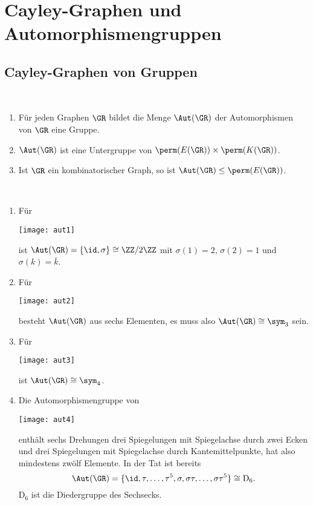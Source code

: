 \chapter{Cayley-Graphen und Automorphismengruppen}

\section{Cayley-Graphen von Gruppen}\label{sec_cayley}

\BEM\
\begin{enumerate}
\item Für jeden Graphen $\GR$ bildet die Menge $\Aut(\GR)$ der
Automorphismen von $\GR$ eine Gruppe.\index{$\Aut(\GR)$}
\item $\Aut(\GR)$ ist eine Untergruppe von
$\perm(E(\GR)) \times \perm(K(\GR))$.
\item Ist $\GR$ ein kombinatorischer Graph, so ist
$\Aut(\GR)\leq \perm(E(\GR))$.
\end{enumerate}

\BSP\
\begin{enumerate}
\item Für
\begin{center}
	\texttt{[image: aut1]}
\end{center}
ist $\Aut(\GR)=\{\id,\sigma\}\cong \ZZ/2\ZZ$ mit
$\sigma(1)=2$, $\sigma(2)=1$ und $\sigma(k)=\bar{k}$.
\item Für
\begin{center}
	\texttt{[image: aut2]}
\end{center}
besteht $\Aut(\GR)$ aus sechs Elementen, es muss also
$\Aut(\GR)\cong \sym_3$ sein.
\item Für
\begin{center}
	\texttt{[image: aut3]}
\end{center}
ist $\Aut(\GR)\cong \sym_4$.
\item Die Automorphismengruppe von
\begin{center}
	\texttt{[image: aut4]}
\end{center}
enthält sechs Drehungen drei Spiegelungen mit Spiegelachse
durch zwei Ecken und drei Spiegelungen mit Spiegelachse durch
Kantemittelpunkte, hat also mindestens zwölf Elemente.
In der Tat ist bereits
\[
\Aut(\GR) = \{\id,\tau,\ldots,\tau^5,
	\sigma,\sigma\tau,\ldots,\sigma \tau^5 \}
\cong \mathrm{D}_6.
\]
$\mathrm{D}_6$ ist die Diedergruppe des Sechsecks.
\end{enumerate}

